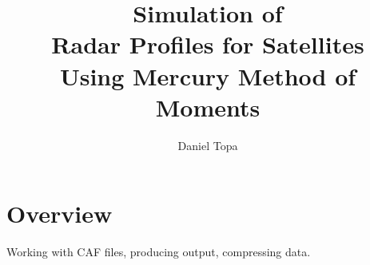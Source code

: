 \documentclass[10pt, oneside]{article}   	%
\title{Simulation of \\Radar Profiles for Satellites \\Using Mercury Method of Moments}
\author{Daniel Topa\\\TopaHIIEmail}
\affil{\hiiafil}
\begin{document}
\maketitle
{}
\tableofcontents

\section{Overview}
\autocite{topa20200303}
\parencite{topa20200303}
Working with CAF files, producing output, compressing data.
\cite{topa-4-20-2024}
\textcite{topa-4-20-2024}

			
			
			\appendix
			
			
			
			
	\printbibliography
%
% 
%
%
%
%
\end{document}
